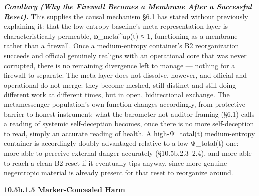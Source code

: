 \documentclass[
]{article}
\begin{document}
\emph{\textbf{Corollary (Why the Firewall Becomes a Membrane After a
Successful Reset).}} This supplies the causal mechanism §6.1 has stated
without previously explaining it: that the low-entropy baseline's
meta-representation layer is characteristically permeable,
ω\_meta\^{}up(t) ≈ 1, functioning as a membrane rather than a firewall.
Once a medium-entropy container's B2 reorganization succeeds and
official genuinely realigns with an operational core that was never
corrupted, there is no remaining divergence left to manage --- nothing
for a firewall to separate. The meta-layer does not dissolve, however,
and official and operational do not merge: they become meshed, still
distinct and still doing different work at different times, but in open,
bidirectional exchange. The metamessenger population's own function
changes accordingly, from protective barrier to honest instrument: what
the barometer-not-auditor framing (§6.1) calls a reading of systemic
self-deception becomes, once there is no more self-deception to read,
simply an accurate reading of health. A high-Ψ\_total(t) medium-entropy
container is accordingly doubly advantaged relative to a low-Ψ\_total(t)
one: more able to perceive external danger accurately (§10.5b.2.3--2.4),
and more able to reach a clean B2 reset if it eventually tips anyway,
since more genuine negentropic material is already present for that
reset to reorganize around.

\textbf{10.5b.1.5 Marker-Concealed Harm}
\end{document}
